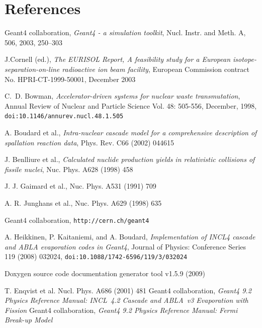 \documentclass[a4paper]{jpconf}
\begin{document}


\section*{References}


\begin{thebibliography}{9}
 Geant4 collaboration, 
\emph{Geant4 - a simulation toolkit}, Nucl. Instr. and Meth. A, 506, 2003, 250--303

J.Cornell (ed.), \emph{The EURISOL Report, A feasibility study for a
European isotope-separation-on-line radioactive ion beam facility},
European Commission contract No. HPRI-CT-1999-50001, December 2003

C.~D. Bowman, \emph{Accelerator-driven systems for nuclear waste transmutation},
Annual Review of Nuclear and Particle Science Vol. 48: 505-556, December, 1998,
{\tt doi:10.1146/annurev.nucl.48.1.505}

 A. Boudard et al., \emph{Intra-nuclear cascade model for
    a comprehensive description of spallation reaction data}, Phys.
  Rev. C66 (2002) 044615

 J. Benlliure et al., \emph{Calculated nuclide
    production yields in relativistic collisions of fissile nuclei},
  Nuc. Phys. A628 (1998) 458

 J. J. Gaimard et al., %
  Nuc. Phys. A531 (1991) 709

 A. R. Junghans et al., %
  Nuc. Phys. A629 (1998) 635

 Geant4 collaboration, {\tt http://\-cern.ch/\-geant4}

A. Heikkinen, P. Kaitaniemi, and A. Boudard,
{\em Implementation of INCL4 cascade and ABLA evaporation codes in Geant4},
Journal of Physics: Conference Series 119 (2008) 032024, {\tt doi:10.1088/1742-6596/119/3/032024}

 Doxygen source code documentation generator tool v1.5.9 (2009)

 T. Enqvist et al. %
  Nucl. Phys. A686 (2001) 481
 Geant4 collaboration, \emph{Geant4 9.2 Physics Reference Manual: INCL~4.2 Cascade and ABLA~v3 Evaporation with Fission} 
 Geant4 collaboration, \emph{Geant4 9.2 Physics Reference Manual: Fermi Break-up Model} 


\end{thebibliography}
\end{document}
